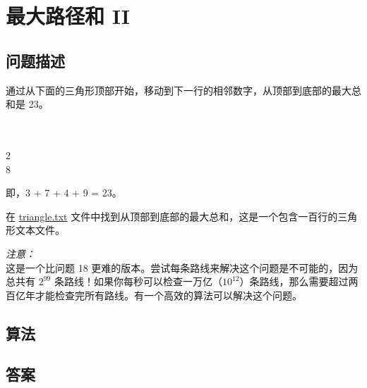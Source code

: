 \section{最大路径和 II}
\subsection{问题描述}
\begin{tcolorbox}
	通过从下面的三角形顶部开始，移动到下一行的相邻数字，从顶部到底部的最大总和是 23。

	\begin{center}
		\\
		\\
		2\quad{}\\
		8\quad{}
	\end{center}

	即，3 + 7 + 4 + 9 = 23。

	在 \href{https://projecteuler.net/resources/documents/0067_triangle.txt}{triangle.txt} 文件中找到从顶部到底部的最大总和，这是一个包含一百行的三角形文本文件。

	\emph{注意：}\\这是一个比问题 18 更难的版本。尝试每条路线来解决这个问题是不可能的，因为总共有 $2^{99}$
	条路线！如果你每秒可以检查一万亿（$10^{12}$）条路线，那么需要超过两百亿年才能检查完所有路线。有一个高效的算法可以解决这个问题。
\end{tcolorbox}

\subsection{算法}

\subsection{答案}
